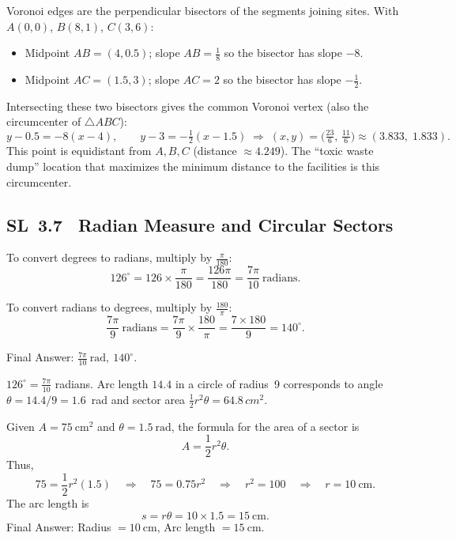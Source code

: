 \documentclass[11pt]{article}
\def\textbf#1{#1}%
\def\mathrm#1{#1}%
\newcommand{\tocsubsection}[1]{\subsection{#1}}
\begin{document}
\begin{solution}
Voronoi edges are the perpendicular bisectors of the segments joining sites. With $A(0,0)$, $B(8,1)$, $C(3,6)$:
\begin{itemize}
\item Midpoint $AB=(4,0.5)$; slope $AB=\tfrac{1}{8}$ so the bisector has slope $-8$.
\item Midpoint $AC=(1.5,3)$; slope $AC=2$ so the bisector has slope $-\tfrac12$.
\end{itemize}
Intersecting these two bisectors gives the common Voronoi vertex (also the circumcenter of $\triangle ABC$):
\[
y-0.5=-8(x-4),\qquad y-3=-\tfrac12(x-1.5)\;\Rightarrow\; (x,y)=\Big(\tfrac{23}{6},\,\tfrac{11}{6}\Big)\approx(3.833,\;1.833).
\]
This point is equidistant from $A,B,C$ (distance $\approx 4.249$). The “toxic waste dump” location that maximizes the minimum distance to the facilities is this circumcenter.
\end{solution}



\tocsubsection{SL 3.7 \; Radian Measure and Circular Sectors}

\begin{solution}
To convert degrees to radians, multiply by \(\frac{\pi}{180}\):
\[
126^\circ = 126 \times \frac{\pi}{180} = \frac{126\pi}{180} = \frac{7\pi}{10} \ \text{radians}.
\]

To convert radians to degrees, multiply by \(\frac{180}{\pi}\):
\[
\frac{7\pi}{9} \ \text{radians} = \frac{7\pi}{9} \times \frac{180}{\pi} = \frac{7 \times 180}{9} = 140^\circ.
\]

\textbf{Final Answer:} \(\boxed{\frac{7\pi}{10} \ \text{rad},\ 140^\circ}\).
\end{solution}




\begin{solution}
$126^{\circ}=\tfrac{7\pi}{10}$ radians.  Arc length $14.4$ in a circle of
radius 9 corresponds to angle $\theta=14.4/9=1.6$ rad and sector area
$\tfrac12 r^2\theta=64.8\,\mathrm{cm}^2$.
\end{solution}

\begin{solution}
Given \(A = 75\ \text{cm}^2\) and \(\theta = 1.5\ \text{rad}\), the formula for the area of a sector is
\[
A = \frac12 r^2 \theta.
\]
Thus,
\[
75 = \frac12 r^2 (1.5) \quad\Rightarrow\quad 75 = 0.75 r^2 \quad\Rightarrow\quad r^2 = 100 \quad\Rightarrow\quad r = \boxed{10\ \text{cm}}.
\]
The arc length is
\[
s = r \theta = 10 \times 1.5 = \boxed{15\ \text{cm}}.
\]
\textbf{Final Answer:} Radius \(= 10\ \text{cm}\), Arc length \(= 15\ \text{cm}\).
\end{solution}
\end{document}
